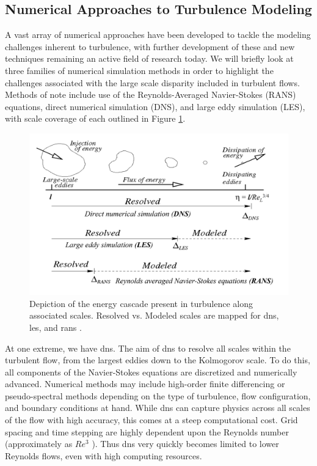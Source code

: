 \subsection{Numerical Approaches to Turbulence Modeling}
A vast array of numerical approaches have been developed to tackle the modeling challenges inherent to turbulence, with further development of these and new techniques remaining an active field of research today. We will briefly look at three families of numerical simulation methods in order to highlight the challenges associated with the large scale disparity included in turbulent flows. Methods of note include use of the Reynolds-Averaged Navier-Stokes (RANS) equations, direct numerical simulation (DNS), and large eddy simulation (LES), with scale coverage of each outlined in Figure \ref{DNSvsLESvsRANS}. 
\begin{figure}[h!]
\begin{center}
\includegraphics[scale=0.065]{figures/DNSvsLESvsRANS}
\end{center}
\caption{Depiction of the energy cascade present in turbulence along associated scales. Resolved vs. Modeled scales are mapped for \gls{dns}, \gls{les}, and \gls{rans} \cite{}.}
\label{DNSvsLESvsRANS}
\end{figure}

At one extreme, we have \gls{dns}. The aim of \gls{dns} to resolve all scales within the turbulent flow, from the largest eddies down to the Kolmogorov scale. To do this, all components of the Navier-Stokes equations are discretized and numerically advanced. Numerical methods may include high-order finite differencing or pseudo-spectral methods depending on the type of turbulence, flow configuration, and boundary conditions at hand. While \gls{dns} can capture physics across all scales of the flow with high accuracy, this comes at a steep computational cost. Grid spacing and time stepping are highly dependent upon the Reynolds number (approximately as $Re^3$ \cite{Pope}). Thus \gls{dns} very quickly becomes limited to lower Reynolds flows, even with high computing resources. 

